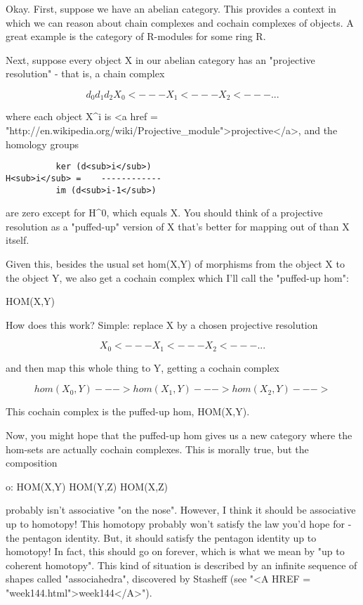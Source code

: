 Okay.  First, suppose we have an abelian category.  This provides a 
context in which we can reason about chain complexes and cochain 
complexes of objects.  A great example is the category of R-modules 
for some ring R.  

Next, suppose every object X in our abelian category has an 
"projective resolution" - that is, a chain complex 

$$
    d_{0}      d_{1}      d_{2}
X_{0} <--- X_{1} <--- X_{2} <--- ...
$$
    
where each object X^{i} is 
<a href = "http://en.wikipedia.org/wiki/Projective_module">projective</a>, and the homology groups

\begin{verbatim}
          ker (d<sub>i</sub>)  
H<sub>i</sub> =    ------------
          im (d<sub>i-1</sub>)
\end{verbatim}
    
are zero except for H^{0}, which equals X.  You should think of
a projective resolution as a "puffed-up" version of X that's
better for mapping out of than X itself.  

Given this, besides the usual set hom(X,Y) of morphisms from the 
object X to the object Y, we also get a cochain complex which I'll 
call the "puffed-up hom":

HOM(X,Y)

How does this work?  Simple: replace X by a chosen projective
resolution 

$$
X_{0} <--- X_{1} <--- X_{2} <--- ...
$$
    

and then map this whole thing to Y, getting a cochain complex

$$
hom(X_{0},Y) ---> hom(X_{1},Y) ---> hom(X_{2},Y) --- >
$$
    
This cochain complex is the puffed-up hom, HOM(X,Y).  

Now, you might hope that the puffed-up hom gives us a new category 
where the hom-sets are actually cochain complexes.  This is morally
true, but the composition

o: HOM(X,Y) \times  HOM(Y,Z) \to  HOM(X,Z)

probably isn't associative "on the nose".  However, I think
it should be associative up to homotopy!  This homotopy probably won't
satisfy the law you'd hope for - the pentagon identity.  But, it
should satisfy the pentagon identity up to homotopy!  In fact, this
should go on forever, which is what we mean by "up to coherent
homotopy".  This kind of situation is described by an infinite
sequence of shapes called "associahedra", discovered by
Stasheff (see "<A HREF = "week144.html">week144</A>").

